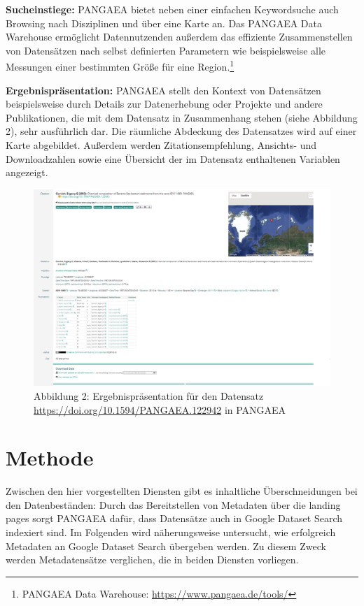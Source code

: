 \documentclass[a4paper,
fontsize=11pt,
oneside,
numbers=noperiodatend,
parskip=half-,
bibliography=totoc,
final
]{scrartcl}
\begin{document}
\textbf{Sucheinstiege:} PANGAEA bietet neben einer einfachen
Keywordsuche auch Browsing nach Disziplinen und über eine Karte an. Das
PANGAEA Data Warehouse ermöglicht Datennutzenden außerdem das effiziente
Zusammenstellen von Datensätzen nach selbst definierten Parametern wie
beispielsweise alle Messungen einer bestimmten Größe für eine
Region.\footnote{PANGAEA Data Warehouse:
  \url{https://www.pangaea.de/tools/}}

\textbf{Ergebnispräsentation:} PANGAEA stellt den Kontext von
Datensätzen beispielsweise durch Details zur Datenerhebung oder Projekte
und andere Publikationen, die mit dem Datensatz in Zusammenhang stehen
(siehe Abbildung 2), sehr ausführlich dar. Die räumliche Abdeckung des
Datensatzes wird auf einer Karte abgebildet. Außerdem werden
Zitationsempfehlung, Ansichts- und Downloadzahlen sowie eine Übersicht
der im Datensatz enthaltenen Variablen angezeigt.

\begin{figure}
\centering
\includegraphics[width=.7\textwidth]{img/abb2_PANGAEA_results.png}
\caption{Abbildung 2: Ergebnispräsentation für den Datensatz
\url{https://doi.org/10.1594/PANGAEA.122942} in PANGAEA}
\end{figure}

\hypertarget{methode}{%
\section{Methode}\label{methode}}

Zwischen den hier vorgestellten Diensten gibt es inhaltliche
Überschneidungen bei den Datenbeständen: Durch das Bereitstellen von
Metadaten über die landing pages sorgt PANGAEA dafür, dass Datensätze
auch in Google Dataset Search indexiert sind. Im Folgenden wird
näherungsweise untersucht, wie erfolgreich Metadaten an Google Dataset
Search übergeben werden. Zu diesem Zweck werden Metadatensätze
verglichen, die in beiden Diensten vorliegen.
\end{document}

